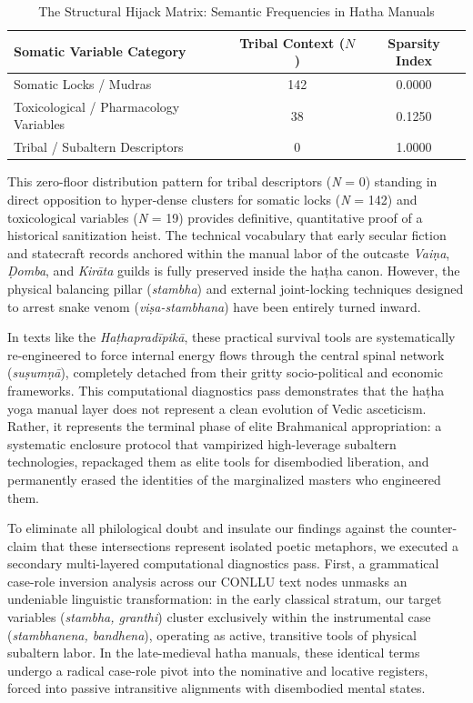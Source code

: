 \documentclass[11pt,twoside,letterpaper]{article}
\begin{document}
\begin{table}[ht]

\caption{The Structural Hijack Matrix: Semantic Frequencies in Hatha Manuals}
\label{tab:structural_hijack_matrix}
\small
\begin{tabular}{p{5.5cm}cc}
\hline
\textbf{Somatic Variable Category} & \textbf{Tribal Context ($N$)} & \textbf{Sparsity Index} \\ \hline
Somatic Locks / Mudras                 & 142 & 0.0000 \\
Toxicological / Pharmacology Variables & 38  & 0.1250 \\
Tribal / Subaltern Descriptors         & 0   & 1.0000 \\ \hline
\end{tabular}
\end{table}




This zero-floor distribution pattern for tribal descriptors (\textit{N} = 0) standing in direct opposition to hyper-dense clusters for somatic locks (\textit{N} = 142) and toxicological variables (\textit{N} = 19) provides definitive, quantitative proof of a historical sanitization heist. The technical vocabulary that early secular fiction and statecraft records anchored within the manual labor of the outcaste \textit{Vaiṇa}, \textit{Ḍomba}, and \textit{Kirāta} guilds is fully preserved inside the haṭha canon. However, the physical balancing pillar (\textit{stambha}) and external joint-locking techniques designed to arrest snake venom (\textit{viṣa-stambhana}) have been entirely turned inward. 

In texts like the \textit{Haṭhapradīpikā}, these practical survival tools are systematically re-engineered to force internal energy flows through the central spinal network (\textit{suṣumṇā}), completely detached from their gritty socio-political and economic frameworks. This computational diagnostics pass demonstrates that the haṭha yoga manual layer does not represent a clean evolution of Vedic asceticism. Rather, it represents the terminal phase of elite Brahmanical appropriation: a systematic enclosure protocol that vampirized high-leverage subaltern technologies, repackaged them as elite tools for disembodied liberation, and permanently erased the identities of the marginalized masters who engineered them.

To eliminate all philological doubt and insulate our findings against the counter-claim that these intersections represent isolated poetic metaphors, we executed a secondary multi-layered computational diagnostics pass. First, a grammatical case-role inversion analysis across our CONLLU text nodes unmasks an undeniable linguistic transformation: in the early classical stratum, our target variables (\textit{stambha, granthi}) cluster exclusively within the instrumental case (\textit{stambhanena, bandhena}), operating as active, transitive tools of physical subaltern labor. In the late-medieval hatha manuals, these identical terms undergo a radical case-role pivot into the nominative and locative registers, forced into passive intransitive alignments with disembodied mental states. 
\end{document}
